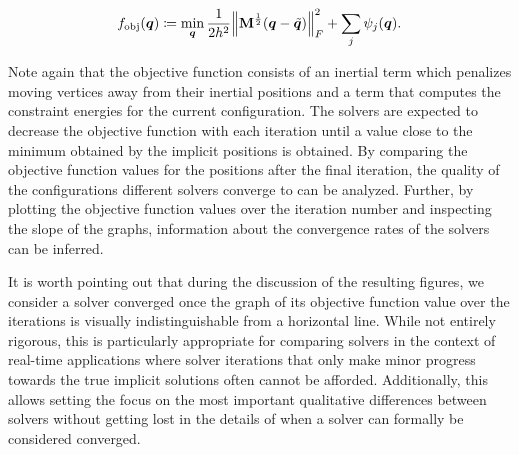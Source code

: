 \begin{equation}\label{eq:variational-implicit-copy}
    f_{\text{obj}}(\bm{q}) \coloneq \min_{\bm{q}} \frac{1}{2h^2} \norm{\mathbf{M}^{\frac{1}{2}}(\bm{q} - \tilde{\bm{q}})}^2_F + \sum_j \psi_j(\bm{q}).
\end{equation}

\noindent Note again that the objective function consists of an inertial term which penalizes moving vertices away from their inertial
positions and a term that computes the constraint energies for the current configuration. The solvers are expected to decrease the objective function with each iteration 
until a value close to the minimum obtained 
by the implicit positions is obtained. By comparing the objective function values for the positions after the final iteration, the quality of the configurations different
solvers converge to can be analyzed. Further, by plotting the objective function values over the iteration number and inspecting the slope of the graphs, information about
the convergence rates of the solvers can be inferred. 

It is worth pointing out that during the discussion of the resulting figures, we consider a solver converged once the 
graph of its objective function value over the iterations is visually indistinguishable from a horizontal line. While not entirely rigorous, this is particularly appropriate 
for comparing solvers in the context of real-time applications where solver iterations that only make minor progress towards the true implicit solutions often cannot be 
afforded. Additionally, this allows setting the focus on the most important qualitative differences between solvers without getting lost in the details of when a solver can 
formally be considered converged.

